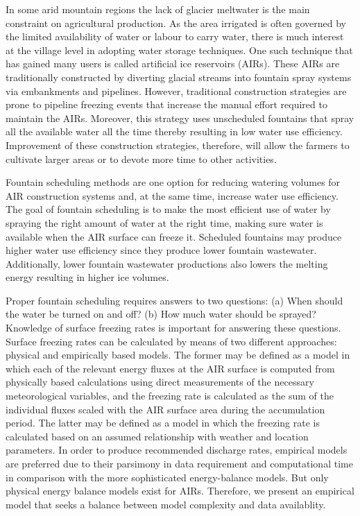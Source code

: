 \documentclass[tc, manuscript]{copernicus}
\begin{document}
\introduction

In some arid mountain regions the lack of glacier meltwater is the main constraint on agricultural production.
As the area irrigated is often governed by the limited availability of water or labour to carry water, there is
much interest at the village level in adopting water storage techniques. One such technique that has gained many
users is called artificial ice reservoirs (AIRs). These AIRs are traditionally constructed by diverting glacial
streams into fountain spray systems via embankments and pipelines. However, traditional construction strategies
are prone to pipeline freezing events that increase the manual effort required to maintain the AIRs. Moreover,
this strategy uses unscheduled fountains that spray all the available water all the time thereby resulting in
low water use efficiency. Improvement of these construction strategies, therefore, will allow the farmers to
cultivate larger areas or to devote more time to other activities. 

Fountain scheduling methods are one option for reducing watering volumes for AIR construction systems and, at
the same time, increase water use efficiency. The goal of fountain scheduling is to make the most efficient use
of water by spraying the right amount of water at the right time, making sure water is available when the AIR
surface can freeze it. Scheduled fountains may produce higher water use efficiency since they produce lower fountain wastewater.
Additionally, lower fountain wastewater productions also lowers the melting energy resulting in higher ice
volumes.

Proper fountain scheduling requires answers to two questions: (a) When should the water be turned on and off?
(b) How much water should be sprayed? Knowledge of surface freezing rates is important for answering these
questions. Surface freezing rates can be calculated by means of two different approaches: physical and
empirically based models. The former may be defined as a model in which each of the relevant energy fluxes at
the AIR surface is computed from physically based calculations using direct measurements of the necessary
meteorological variables, and the freezing rate is calculated as the sum of the individual fluxes scaled with
the AIR surface area during the accumulation period. The latter may be defined as a model in which the freezing
rate is calculated based on an assumed relationship with weather and location parameters. In order to produce
recommended discharge rates, empirical models are preferred due to their parsimony in data requirement and
computational time in comparison with the more sophisticated energy-balance models. But only physical energy
balance models exist for AIRs. Therefore, we present an empirical model that seeks a balance between model
complexity and data availablity.
\end{document}
